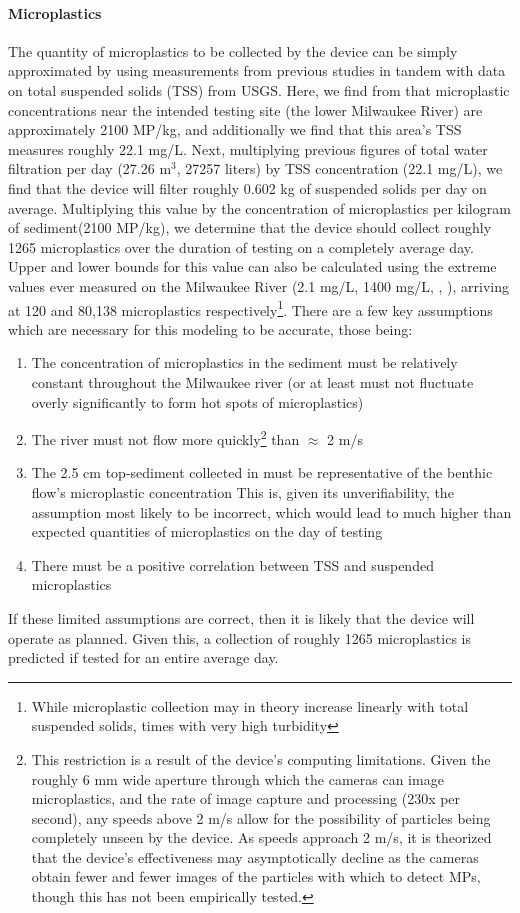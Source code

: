 \documentclass[fleqn,10pt]{SelfArx} %
\begin{document}
	\paragraph{Microplastics}
	The quantity of microplastics to be collected by the device can be simply approximated by using measurements from previous studies in tandem with data on total suspended solids (TSS) from USGS. Here, we find from \cite{LenakerEtAlvertdist} that microplastic concentrations near the intended testing site (the lower Milwaukee River) are approximately 2100 MP/kg, and additionally we find that this area's TSS measures roughly 22.1 mg/L. Next, multiplying previous figures of total water filtration per day (27.26 m$^3$, 27257 liters) by TSS concentration (22.1 mg/L), we find that the device will filter roughly 0.602 kg of suspended solids per day on average. Multiplying this value by the concentration of microplastics per kilogram of sediment(2100 MP/kg), we determine that the device should collect roughly 1265 microplastics over the duration of testing on a completely average day. Upper and lower bounds for this value can also be calculated using the extreme values ever measured on the Milwaukee River (2.1 mg/L, 1400 mg/L, \cite{USGSMil}, \cite{MKETSS}), arriving at 120 and 80,138 microplastics respectively\footnote{While microplastic collection may in theory increase linearly with total suspended solids, times with very high turbidity }. 
	\linebreak
	There are a few key assumptions which are necessary for this modeling to be accurate, those being:
	\begin{enumerate}
		\item The concentration of microplastics in the sediment must be relatively constant throughout the Milwaukee river (or at least must not fluctuate overly significantly to form hot spots of microplastics)
		\item The river must not flow more quickly\footnote{This restriction is a result of the device's computing limitations. Given the roughly 6 mm wide aperture through which the cameras can image microplastics, and the rate of image capture and processing (230x per second), any speeds above 2 m/s allow for the possibility of particles being completely unseen by the device. As speeds approach 2 m/s, it is theorized that the device's effectiveness may asymptotically decline as the cameras obtain fewer and fewer images of the particles with which to detect MPs, though this has not been empirically tested.} than $\approx$ 2 m/s
		\item The 2.5 cm top-sediment collected in \cite{LenakerEtAlvertdist} must be representative of the \gls{benthic} flow's microplastic concentration
		\subitem This is, given its unverifiability, the assumption most likely to be incorrect, which would lead to much higher than expected quantities of microplastics on the day of testing
		\item There must be a positive correlation between TSS and suspended microplastics
	\end{enumerate}
	If these limited assumptions are correct, then it is likely that the device will operate as planned. Given this, a collection of roughly 1265 microplastics is predicted if tested for an entire average day.
	
\end{document}
